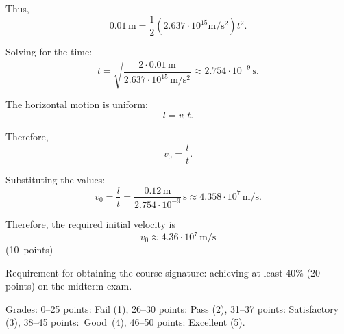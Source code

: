 \documentclass[12pt]{letter}
\begin{document}
\begin{enumerate}
Thus,
$$0.01\,\mathrm{m}=\frac12(2.637\cdot10^{15}\mathrm{m/s^2})t^2.$$

Solving for the time:
$$t=\sqrt{\frac{2\cdot0.01\,\mathrm{m}}{2.637\cdot10^{15}\,\mathrm{m/s^2}}}\approx 2.754 \cdot10^{-9}\,\mathrm{s}.$$

The horizontal motion is uniform:
$$l=v_0 t.$$

Therefore,
$$v_0=\frac{l}{t}.$$

Substituting the values:
$$v_0=\frac{l}{t}=\frac{0.12\,\mathrm{m}}{2.754 \cdot10^{-9}}\,\mathrm{s}\approx 4.358\cdot 10^7\,\mathrm{m/s}.$$

Therefore, the required initial velocity is
$$\boxed{v_0\approx 4.36\cdot10^7\,\mathrm{m/s}}$$
\hfill (10~points)

\end{enumerate}


Requirement for obtaining the course signature: achieving at least 40\% (20\,points) on the midterm exam.

Grades: 0--25 points: Fail (1), 26--30 points: Pass (2), 31--37 points: Satisfactory (3), 38--45 points:~Good~(4), 46--50 points: Excellent (5).


\vfill
\end{document}

